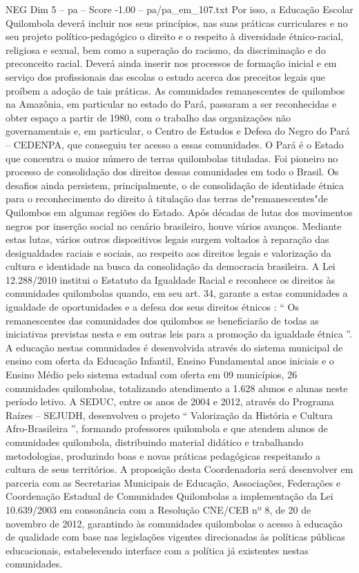\begin{textsample}{NEG Dim 5 – pa – Score -1.00 – pa/pa\_em\_107.txt}
Por isso, a Educação Escolar Quilombola deverá incluir nos seus princípios, nas suas práticas curriculares e no seu projeto político-pedagógico o direito e o respeito à diversidade étnico-racial, religiosa e sexual, bem como a superação do racismo, da discriminação e do preconceito racial.
Deverá ainda inserir nos processos de formação inicial e em serviço dos profissionais das escolas o estudo acerca dos preceitos legais que proíbem a adoção de tais práticas.
As comunidades remanescentes de quilombos na Amazônia, em particular no estado do Pará, passaram a ser reconhecidas e obter espaço a partir de 1980, com o trabalho das organizações não governamentais e, em particular, o Centro de Estudos e Defesa do Negro do Pará – CEDENPA, que conseguiu ter acesso a essas comunidades.
O Pará é o Estado que concentra o maior número de terras quilombolas tituladas.
Foi pioneiro no processo de consolidação dos direitos dessas comunidades em todo o Brasil.
Os desafios ainda persistem, principalmente, o de consolidação de identidade étnica para o reconhecimento do direito à titulação das terras de"remanescentes"de Quilombos em algumas regiões do Estado.
Após décadas de lutas dos movimentos negros por inserção social no cenário brasileiro, houve vários avanços.
Mediante estas lutas, vários outros dispositivos legais surgem voltados à reparação das desigualdades raciais e sociais, ao respeito aos direitos legais e valorização da cultura e identidade na busca da consolidação da democracia brasileira.
A Lei 12.288/2010 institui o Estatuto da Igualdade Racial e reconhece os direitos às comunidades quilombolas quando, em seu art. 34, garante a estas comunidades a igualdade de oportunidades e a defesa dos seus direitos étnicos : “ Os remanescentes das comunidades dos quilombos se beneficiarão de todas as iniciativas previstas nesta e em outras leis para a promoção da igualdade étnica ”.
A educação nestas comunidades é desenvolvida através do sistema municipal de ensino com oferta da Educação Infantil, Ensino Fundamental anos iniciais e o Ensino Médio pelo sistema estadual com oferta em 09 municípios, 26 comunidades quilombolas, totalizando atendimento a 1.628 alunos e alunas neste período letivo.
A SEDUC, entre os anos de 2004 e 2012, através do Programa Raízes – SEJUDH, desenvolveu o projeto “ Valorização da História e Cultura Afro-Brasileira ”, formando professores quilombola e que atendem alunos de comunidades quilombola, distribuindo material didático e trabalhando metodologias, produzindo boas e novas práticas pedagógicas respeitando a cultura de seus territórios.
A proposição desta Coordenadoria será desenvolver em parceria com as Secretarias Municipais de Educação, Associações, Federações e Coordenação Estadual de Comunidades Quilombolas a implementação da Lei 10.639/2003 em consonância com a Resolução CNE/CEB nº 8, de 20 de novembro de 2012, garantindo às comunidades quilombolas o acesso à educação de qualidade com base nas legislações vigentes direcionadas às políticas públicas educacionais, estabelecendo interface com a política já existentes nestas comunidades.

\end{textsample}
